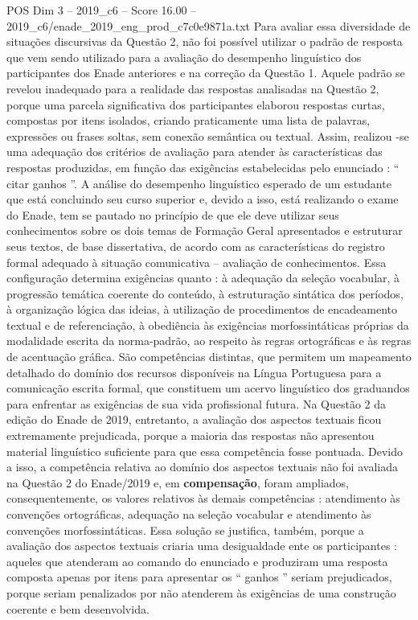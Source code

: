 \begin{textsample}{POS Dim 3 – 2019\_c6 – Score 16.00 – 2019\_c6/enade\_2019\_eng\_prod\_c7c0e9871a.txt}
Para avaliar essa diversidade de situações discursivas da Questão 2, não foi possível utilizar o padrão de resposta que vem sendo utilizado para a avaliação do desempenho linguístico dos participantes dos Enade anteriores e na correção da Questão 1.
Aquele padrão se revelou inadequado para a realidade das respostas analisadas na Questão 2, porque uma parcela significativa dos participantes elaborou respostas curtas, compostas por itens isolados, criando praticamente uma lista de palavras, expressões ou frases soltas, sem conexão semântica ou textual.
Assim, realizou -se uma adequação dos critérios de avaliação para atender às características das respostas produzidas, em função das exigências estabelecidas pelo enunciado : “ citar ganhos ”.
A análise do desempenho linguístico esperado de um estudante que está concluindo seu curso superior e, devido a isso, está realizando o exame do Enade, tem se pautado no princípio de que ele deve utilizar seus conhecimentos sobre os dois temas de Formação Geral apresentados e estruturar seus textos, de base dissertativa, de acordo com as características do registro formal adequado à situação comunicativa – avaliação de conhecimentos.
Essa configuração determina exigências quanto : à adequação da seleção vocabular, à progressão temática coerente do conteúdo, à estruturação sintática dos períodos, à organização lógica das ideias, à utilização de procedimentos de encadeamento textual e de referenciação, à obediência às exigências morfossintáticas próprias da modalidade escrita da norma-padrão, ao respeito às regras ortográficas e às regras de acentuação gráfica.
São competências distintas, que permitem um mapeamento detalhado do domínio dos recursos disponíveis na Língua Portuguesa para a comunicação escrita formal, que constituem um acervo linguístico dos graduandos para enfrentar as exigências de sua vida profissional futura.
Na Questão 2 da edição do Enade de 2019, entretanto, a avaliação dos aspectos textuais ficou extremamente prejudicada, porque a maioria das respostas não apresentou material linguístico suficiente para que essa competência fosse pontuada.
Devido a isso, a competência relativa ao domínio dos aspectos textuais não foi avaliada na Questão 2 do Enade/2019 e, em \textbf{compensação}, foram ampliados, consequentemente, os valores relativos às demais competências : atendimento às convenções ortográficas, adequação na seleção vocabular e atendimento às convenções morfossintáticas.
Essa solução se justifica, também, porque a avaliação dos aspectos textuais criaria uma desigualdade ente os participantes : aqueles que atenderam ao comando do enunciado e produziram uma resposta composta apenas por itens para apresentar os “ ganhos ” seriam prejudicados, porque seriam penalizados por não atenderem às exigências de uma construção coerente e bem desenvolvida.

\end{textsample}
